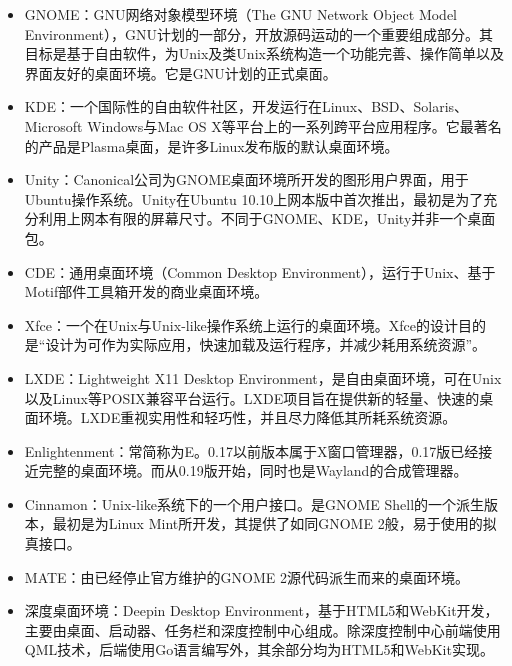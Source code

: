 \documentclass{TIJMUjiaoanSY}
\begin{document}
\begin{enumerate}
\begin{enumerate}
\begin{itemize}
	  \item GNOME：GNU网络对象模型环境（The GNU Network Object Model Environment），GNU计划的一部分，开放源码运动的一个重要组成部分。其目标是基于自由软件，为Unix及类Unix系统构造一个功能完善、操作简单以及界面友好的桌面环境。它是GNU计划的正式桌面。
	  \item KDE：一个国际性的自由软件社区，开发运行在Linux、BSD、Solaris、Microsoft Windows与Mac OS X等平台上的一系列跨平台应用程序。它最著名的产品是Plasma桌面，是许多Linux发布版的默认桌面环境。
	  \item Unity：Canonical公司为GNOME桌面环境所开发的图形用户界面，用于Ubuntu操作系统。Unity在Ubuntu 10.10上网本版中首次推出，最初是为了充分利用上网本有限的屏幕尺寸。不同于GNOME、KDE，Unity并非一个桌面包。
	  \item CDE：通用桌面环境（Common Desktop Environment），运行于Unix、基于Motif部件工具箱开发的商业桌面环境。
	  \item Xfce：一个在Unix与Unix-like操作系统上运行的桌面环境。Xfce的设计目的是“设计为可作为实际应用，快速加载及运行程序，并减少耗用系统资源”。
	  \item LXDE：Lightweight X11 Desktop Environment，是自由桌面环境，可在Unix以及Linux等POSIX兼容平台运行。LXDE项目旨在提供新的轻量、快速的桌面环境。LXDE重视实用性和轻巧性，并且尽力降低其所耗系统资源。
	  \item Enlightenment：常简称为E。0.17以前版本属于X窗口管理器，0.17版已经接近完整的桌面环境。而从0.19版开始，同时也是Wayland的合成管理器。
	  \item Cinnamon：Unix-like系统下的一个用户接口。是GNOME Shell的一个派生版本，最初是为Linux Mint所开发，其提供了如同GNOME 2般，易于使用的拟真接口。
	  \item MATE：由已经停止官方维护的GNOME 2源代码派生而来的桌面环境。


\otherTail
\newpage
\otherHeader

	  \item 深度桌面环境：Deepin Desktop Environment，基于HTML5和WebKit开发，主要由桌面、启动器、任务栏和深度控制中心组成。除深度控制中心前端使用QML技术，后端使用Go语言编写外，其余部分均为HTML5和WebKit实现。


\end{itemize}
\end{enumerate}
\end{enumerate}
\end{document}
